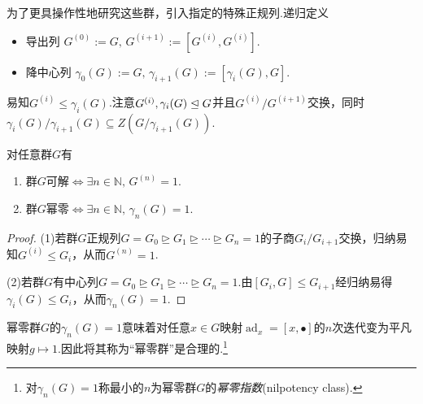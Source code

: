 为了更具操作性地研究这些群，引入指定的特殊正规列.递归定义
\begin{itemize}
	\item {\heiti 导出列} $G^{(0)}:=G,\,G^{(i+1)}:=[G^{(i)},G^{(i)}]$.
	\item {\heiti 降中心列} $\gamma_0(G):=G,\,\gamma_{i+1}(G):=[\gamma_i(G),G]$.
\end{itemize}


易知$G^{(i)}\le\gamma_i(G)$.注意$G^{(i)},\gamma_i(G)\trianglelefteq G$并且$G^{(i)}/G^{(i+1)}$交换，同时$\gamma_i(G)/\gamma_{i+1}(G)\subseteq Z(G/\gamma_{i+1}(G))$.
\begin{prop}
	对任意群$G$有
	\begin{enumerate}
		\item 群$G$可解$\iff\exists n\in\mathbb{N},\,G^{(n)}=1$.
		\item 群$G$幂零$\iff\exists n\in\mathbb{N},\,\gamma_n(G)=1$.
	\end{enumerate}
\end{prop}
\begin{proof}
	\hspace*{5.4pt}(1)若群$G$正规列$G=G_0\trianglerighteq G_1\trianglerighteq\cdots\trianglerighteq G_n=1$的子商$G_{i}/G_{i+1}$交换，归纳易知$G^{(i)}\le G_i$，从而$G^{(n)}=1$.

	(2)若群$G$有中心列$G=G_0\trianglerighteq G_1\trianglerighteq\cdots\trianglerighteq G_n=1$.由$[G_i,G]\le G_{i+1}$经归纳易得$\gamma_i(G)\le G_i$，从而$\gamma_n(G)=1$.
\end{proof}
\begin{remark}
	幂零群$G$的$\gamma_n(G)=1$意味着对任意$x\in G$映射$\operatorname*{ad}_x=[x,\bullet]$的$n$次迭代变为平凡映射$g\mapsto 1$.因此将其称为“幂零群”是合理的.\footnote{对$\gamma_n(G)=1$称最小的$n$为幂零群$G$的\emph{幂零指数}(nilpotency class).}
\end{remark}



